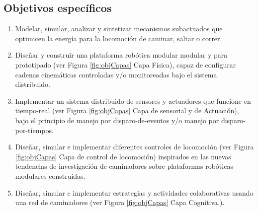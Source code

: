 \documentclass[12pt,twoside,onecolumn,letterpaper]{article}
\begin{document}
\subsection{Objetivos espec\'ificos}
\label{sec:objesp}
\begin{enumerate}[\textbf{OE:} 1.]
\item Modelar, simular, analizar y sintetizar mecanismos subactuados que optimicen la energ\'ia para la locomoci\'on de caminar, saltar o correr.\par 
\item Dise\~nar y construir una plataforma rob\'otica modular modular y para prototipado (ver Figura \ref{fig:objCapas} Capa Física), capaz de configurar cadenas cinem\'aticas  controladas y/o monitoreadas bajo el sistema distribuido.\par
\item Implementar un sistema distribuido de sensores y actuadores que funcione en tiempo-real  (ver Figura \ref{fig:objCapas} Capa de sensorial y de Actuaci\'on), bajo el principio de manejo por disparo-de-eventos y/o manejo por disparo-por-tiempos\cite{Kimm2012}.\par
\item Dise\~nar, simular e implementar diferentes controles de locomoci\'on (ver Figura \ref{fig:objCapas} Capa de control de locomoci\'on) inspirados en las nuevas tendencias de investigaci\'on de caminadores sobre plataformas rob\'oticas modulares construidas.\par
\item Dise\~nar, simular e implementar estrategias y actividades colaborativas usando una red de caminadores  (ver Figura \ref{fig:objCapas} Capa Cognitiva.).\par
\end{enumerate}
\end{document}

